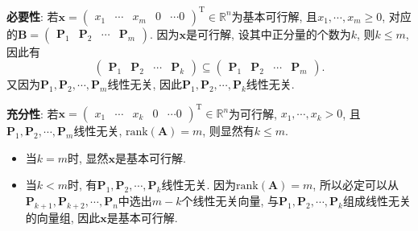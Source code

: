 \textbf{必要性}:
若$\bm{x}=\begin{pmatrix}x_1 & \cdots & x_m & 0 & \cdots 0\end{pmatrix}^\mathrm{T}\in\mathbb{R}^n$为基本可行解, 且$x_1,\cdots,x_m\geq0$, 对应的$\bm{B}=\begin{pmatrix}\bm{P}_1 & \bm{P}_2 & \cdots & \bm{P}_m\end{pmatrix}$.
因为$\bm{x}$是可行解, 设其中正分量的个数为$k$, 则$k\leq m$, 因此有
\begin{equation*}
    \begin{pmatrix}
        \bm{P}_1 & \bm{P}_2 & \cdots & \bm{P}_k
    \end{pmatrix}
    \subseteq
    \begin{pmatrix}
        \bm{P}_1 & \bm{P}_2 & \cdots & \bm{P}_m
    \end{pmatrix}.
\end{equation*}
又因为$\bm{P}_1, \bm{P}_2, \cdots, \bm{P}_m$线性无关, 因此$\bm{P}_1, \bm{P}_2, \cdots, \bm{P}_k$线性无关.


\textbf{充分性}:
若$\bm{x}=\begin{pmatrix}x_1 & \cdots & x_k & 0 & \cdots 0\end{pmatrix}^\mathrm{T}\in\mathbb{R}^n$为可行解, $x_1,\cdots,x_k>0$, 且$\bm{P}_1, \bm{P}_2, \cdots, \bm{P}_m$线性无关, $\mathrm{rank}(\bm{A})=m$, 则显然有$k\leq m$.

\begin{itemize}
    \item
        当$k=m$时, 显然$\bm{x}$是基本可行解.

    \item
        当$k<m$时, 有$\bm{P}_1, \bm{P}_2, \cdots, \bm{P}_k$线性无关. 因为$\mathrm{rank}(\bm{A})=m$, 所以必定可以从$\bm{P}_{k+1}, \bm{P}_{k+2}, \cdots, \bm{P}_n$中选出$m-k$个线性无关向量, 与$\bm{P}_1, \bm{P}_2, \cdots, \bm{P}_k$组成线性无关的向量组, 因此$\bm{x}$是基本可行解.
\end{itemize}
